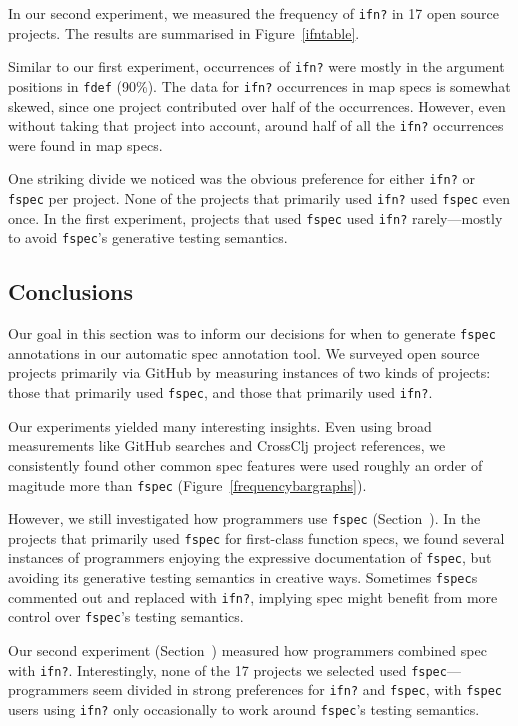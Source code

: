 In our second experiment, we measured the frequency of \texttt{ifn?} in 17 open source projects.
The results are summarised in Figure~\ref{ifntable}.

Similar to our first experiment, occurrences of \texttt{ifn?} were mostly in the argument
positions in \texttt{fdef} (90\%).
The data for \texttt{ifn?} occurrences in map specs is somewhat skewed, since one project
contributed over half of the occurrences. However, even without taking that project into account,
around half of all the \texttt{ifn?} occurrences were found in map specs.

One striking divide we noticed was the obvious preference for either \texttt{ifn?} or \texttt{fspec}
per project. None of the projects that primarily used \texttt{ifn?} used \texttt{fspec} even once.
In the first experiment, projects that used \texttt{fspec} used \texttt{ifn?} rarely---mostly to
avoid \texttt{fspec}'s generative testing semantics.

\subsection{Conclusions}

Our goal in this section was to inform our decisions for when to generate \texttt{fspec}
annotations in our automatic spec annotation tool.
We surveyed open source projects primarily via GitHub by measuring instances of two kinds of projects:
those that primarily used \texttt{fspec}, and those that primarily used \texttt{ifn?}.

Our experiments yielded many interesting insights. Even using broad measurements like
GitHub searches and CrossClj project references,
we consistently found other common spec features were used roughly an order of
magitude more than \texttt{fspec} (Figure~\ref{frequencybargraphs}).

However, we still investigated how programmers use \texttt{fspec} (Section~\label{experiment1}).
In the projects that primarily used \texttt{fspec} for first-class function specs,
we found several instances of programmers enjoying the expressive documentation
of \texttt{fspec}, but avoiding its generative testing semantics in creative ways.
Sometimes \texttt{fspec}s commented out and replaced with \texttt{ifn?}, implying
spec might benefit from more control over \texttt{fspec}'s testing semantics.

Our second experiment (Section~\label{experiment2}) measured how programmers combined
spec with \texttt{ifn?}.
Interestingly, none of the 17 projects we selected used \texttt{fspec}---programmers
seem divided in strong preferences for \texttt{ifn?} and \texttt{fspec}, with
\texttt{fspec} users using \texttt{ifn?} only occasionally to work around
\texttt{fspec}'s testing semantics.

